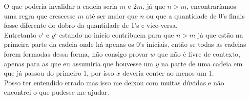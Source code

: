 \documentclass[12pt]{article}
\def\myling{{15}} %
\begin{document}
\begin{tcolorbox}[rounded corners, breakable, colback=yellow!5, colframe=red!40!black, title={A linguagem $\mathcal{L}_{\myling}$ não é livre de contexto.}]
 O que poderia invalidar a cadeia seria $m$ e $2m$, já que $n > m$, encontraríamos uma regra que crescesse $m$ até ser maior que $n$ ou que a quantidade de 0's finais fosse diferente do dobro da quantidade de 1's e vice-versa.\\[10pt] 
 Entretanto $v^i$ e $y^i$ estando no início contribuem para que $n > m$ já que estão na primeira parte da cadeia onde há apenas os 0's iniciais, então se todas as cadeias forem formadas dessa forma, não consigo provar $w$ que não é livre de contexto, apenas para as que eu assumiria que houvesse um $y$ na parte de uma cadeia em que já passou do primeiro 1, por isso $x$ deveria conter ao menos um 1.\\[10pt]
 Posso ter entendido errado mas isso me deixou com muitas dúvidas e não encontrei o que pudesse me ajudar.
\end{tcolorbox}
\end{document}
